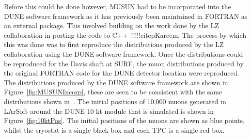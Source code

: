 Before this could be done however, MUSUN had to be incorporated into the DUNE software framework as it has previously been maintained in FORTRAN as an external package. This involved building on the work done by the LZ collaboration in porting the code to C++~!!!!!citep{Kareem}. The process by which this was done was to first reproduce the distributions produced by the LZ collaboration using the DUNE software framework. Once the distributions could be reproduced for the Davis shaft at SURF, the muon distributions produced by the original FORTRAN code for the DUNE detector location were reproduced. The distributions produced by the DUNE software framework are shown in Figure~\ref{fig:MUSUNIncorp}, these are seen to be consistent with the same distributions shown in~\citep{MUSUNLBNE}. The initial positions of 10,000 muons generated in LArSoft around the DUNE 10 kt module that is simulated is shown in Figure~\ref{fig:10ktPos}. The initial positions of the muons are shown as blue points, whilst the cryostat is a single black box and each TPC is a single red box. \\

